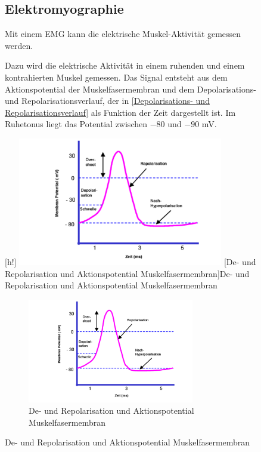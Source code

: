 \begin{figure}
\subsection{Elektromyographie}

Mit einem EMG kann die elektrische Muskel-Aktivität gemessen werden.

Dazu wird die elektrische Aktivität in einem ruhenden und einem kontrahierten Muskel gemessen. Das Signal entsteht aus dem Aktionspotential der Muskelfasermembran und dem Depolarisations- und Repolarisationsverlauf, der in \autoref{Depolarisations- und Repolarisationsverlauf} als Funktion der Zeit dargestellt ist. Im Ruhetonus liegt das Potential zwischen $-80$ und  $-90$ mV.

\begin{center}[h!]
    \centering
    \includegraphics[width=0.8\textwidth]{img/De- Repolarisation.PNG}
    [De- und Repolarisation und Aktionspotential Muskelfasermembran]{De- und Repolarisation und Aktionspotential Muskelfasermembran \cite{Vorlesung-Muskulatur-EMG}}\label{Depolarisations- und Repolarisationsverlauf}
\end{center}
\begin{figure}[h!]
      \centering
      \includegraphics[width=0.8\textwidth]{img/De- Repolarisation.PNG}
      \caption{De- und Repolarisation und Aktionspotential Muskelfasermembran \cite{Vorlesung-Muskulatur-EMG}}
      \label{fig:depolarisations-und-repolarisationsverlauf}
\end{figure}


\end{figure}
